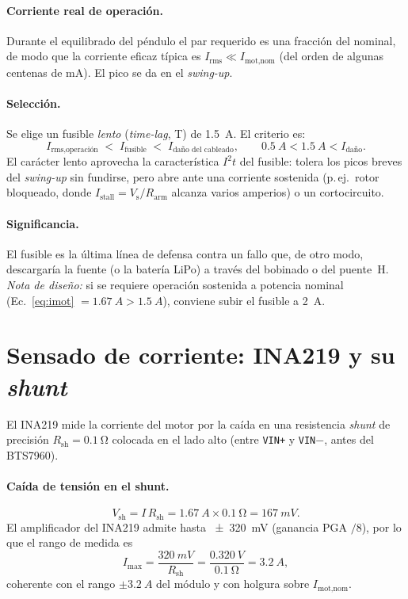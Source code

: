 \documentclass[11pt,letterpaper]{article}
\begin{document}
\paragraph{Corriente real de operación.} Durante el equilibrado del péndulo el par
requerido es una fracción del nominal, de modo que la corriente eficaz típica es
$I_\text{rms}\ll I_\text{mot,nom}$ (del orden de algunas centenas de \si{mA}). El
pico se da en el \emph{swing-up}.

\paragraph{Selección.} Se elige un fusible \emph{lento} (\emph{time-lag}, T) de
\SI{1.5}{A}. El criterio es:
\begin{equation}
  I_\text{rms,operación} \;<\; I_\text{fusible} \;<\; I_\text{daño del cableado},
  \qquad
  \SI{0.5}{A} < \SI{1.5}{A} < I_\text{daño}.
\end{equation}
El carácter lento aprovecha la característica $I^2t$ del fusible: tolera los picos
breves del \emph{swing-up} sin fundirse, pero abre ante una corriente sostenida
(p.\,ej.\ rotor bloqueado, donde $I_\text{stall}=V_\text{s}/R_\text{arm}$ alcanza
varios amperios) o un cortocircuito.

\paragraph{Significancia.} El fusible es la última línea de defensa contra un fallo
que, de otro modo, descargaría la fuente (o la batería LiPo) a través del bobinado
o del puente~H. \emph{Nota de diseño:} si se requiere operación sostenida a
potencia nominal (Ec.~\ref{eq:imot} $=\SI{1.67}{A}>\SI{1.5}{A}$), conviene subir el
fusible a \SI{2}{A}.

\section{Sensado de corriente: INA219 y su \emph{shunt}}
El INA219 mide la corriente del motor por la caída en una resistencia \emph{shunt}
de precisión $R_\text{sh}=\SI{0.1}{\ohm}$ colocada en el lado alto (entre
\texttt{VIN+} y \texttt{VIN$-$}, antes del BTS7960).

\paragraph{Caída de tensión en el shunt.}
\begin{equation}
  V_\text{sh} = I\,R_\text{sh}
  = \SI{1.67}{A}\times\SI{0.1}{\ohm} = \SI{167}{mV}.
\end{equation}
El amplificador del INA219 admite hasta \SI{\pm320}{mV} (ganancia PGA $/8$), por lo
que el rango de medida es
\begin{equation}
  I_\text{max} = \frac{\SI{320}{mV}}{R_\text{sh}}
  = \frac{\SI{0.320}{V}}{\SI{0.1}{\ohm}} = \SI{3.2}{A},
\end{equation}
coherente con el rango $\pm\SI{3.2}{A}$ del módulo y con holgura sobre
$I_\text{mot,nom}$.
\end{document}
